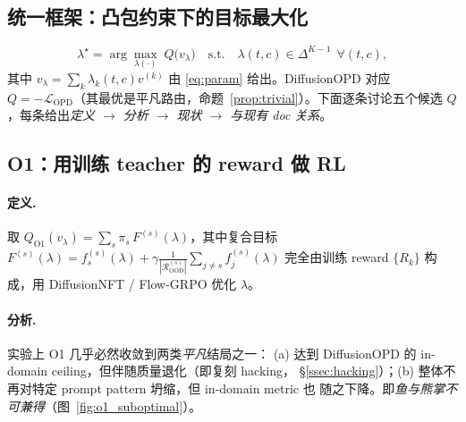 \documentclass[11pt,a4paper]{article}
\newcommand{\loss}{\mathcal{L}}
\newcommand{\OOD}{\mathrm{OOD}}
\newcommand{\OPD}{\mathrm{OPD}}
\theoremstyle{definition}
\begin{document}
\subsection{统一框架：凸包约束下的目标最大化}
\label{ssec:framework}

\begin{equation}
\boxed{\;\lambda^\star=\arg\max_{\lambda(\cdot)}\;Q\big(v_\lambda\big)
\quad\text{s.t.}\quad \lambda(t,c)\in\Delta^{K-1}\ \ \forall (t,c),\;}
\label{eq:framework}
\end{equation}
其中 $v_\lambda=\sum_k\lambda_k(t,c)v^{(k)}$ 由 \eqref{eq:param} 给出。DiffusionOPD 对应
$Q=-\loss_{\OPD}$（其最优是平凡路由，命题~\ref{prop:trivial}）。下面逐条讨论五个候选
$Q$，每条给出\emph{定义 $\to$ 分析 $\to$ 现状 $\to$ 与现有 doc 关系}。

\subsection{O1：用训练 teacher 的 reward 做 RL}
\label{ssec:o1}

\paragraph{定义.} 取 $Q_{\text{O1}}(v_\lambda)=\sum_s\pi_s\,F^{(s)}(\lambda)$，其中复合目标
$F^{(s)}(\lambda)=f_s^{(s)}(\lambda)+\gamma\frac{1}{|\mathcal{R}_{\OOD}^{(s)}|}
\sum_{j\neq s}f_j^{(s)}(\lambda)$ 完全由训练 reward $\{R_k\}$ 构成，用 DiffusionNFT /
Flow-GRPO 优化 $\lambda$。

\paragraph{分析.} 实验上 O1 几乎必然收敛到两类\emph{平凡}结局之一：
(a) 达到 DiffusionOPD 的 in-domain ceiling，但伴随质量退化（即复刻 hacking，
\S\ref{ssec:hacking}）；(b) 整体不再对特定 prompt pattern 坍缩，但 in-domain metric 也
随之下降。即\emph{鱼与熊掌不可兼得}（图~\ref{fig:o1_suboptimal}）。
\end{document}
